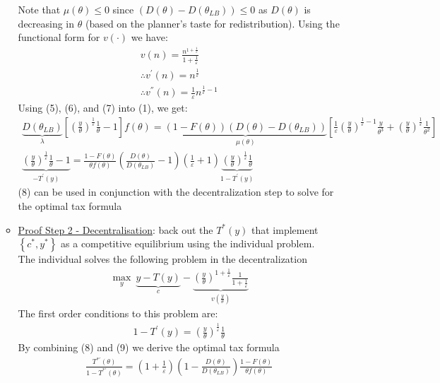 \documentclass{article}
\begin{document}
\begin{itemize}
\begin{itemize}
        Note that $\mu(\theta) \leq 0$ since $(D(\theta) - D(\theta_{LB})) \leq 0$ as $D(\theta)$ is decreasing in $\theta$ (based on the planner's taste for redistribution). Using the functional form for $v(\cdot)$ we have:
        \begin{gather*}
            v(n) = \frac{n^{1+\tfrac{1}{\varepsilon}}}{1 + \tfrac{1}{\varepsilon}} \\
            \therefore v^{'}(n) = n^{\tfrac{1}{\varepsilon}} \tag{7} \\
            \therefore v^{''}(n) = \frac{1}{\varepsilon} n^{\tfrac{1}{\varepsilon} -1} \tag{7}
        \end{gather*}
        Using (5), (6), and (7) into (1), we get:
        \begin{gather*}
            \underbrace{D(\theta_{LB})}_{\lambda} [(\frac{y}{\theta})^{\tfrac{1}{\varepsilon}} \frac{1}{\theta} - 1] f(\theta) = \underbrace{(1 - F(\theta))(D(\theta) - D(\theta_{LB}))}_{\mu(\theta)} [\frac{1}{\varepsilon} (\frac{y}{\theta})^{\tfrac{1}{\varepsilon} - 1} \frac{y}{\theta^{3}} + (\frac{y}{\theta})^{\tfrac{1}{\varepsilon}} \frac{1}{\theta^{2}}] \\
            \underbrace{(\frac{y}{\theta})^{\frac{1}{\varepsilon}} \frac{1}{\theta} - 1}_{-T^{'}(y)} = \frac{1 - F(\theta)}{\theta f (\theta)} (\frac{D(\theta)}{D(\theta_{LB})} - 1) (\frac{1}{\varepsilon} + 1) \underbrace{(\frac{y}{\theta})^{\tfrac{1}{\varepsilon}} \frac{1}{\theta}}_{1 - T^{'}(y)} \tag{8}
        \end{gather*}
        (8) can be used in conjunction with the decentralization step to solve for the optimal tax formula
        \item  \underline{Proof Step 2 - Decentralisation}: back out the $T^{*}(y)$ that implement $\left\{ c^{*}, y^{*} \right\}$ as a competitive equilibrium using the individual problem. \\
        The individual solves the following problem in the decentralization
        \begin{gather*}
            \max_{y} \ \underbrace{y - T(y)}_{c} - \underbrace{(\frac{y}{\theta})^{1 + \frac{1}{\varepsilon}} \frac{1}{1 + \tfrac{1}{\varepsilon}}}_{v(\tfrac{y}{\theta})}
        \end{gather*}
        The first order conditions to this problem are:
        \begin{gather*}
            1 - T^{'}(y) = (\frac{y}{\theta})^{\tfrac{1}{\varepsilon}} \frac{1}{\theta} \tag{9}
        \end{gather*}
        By combining (8) and (9) we derive the optimal tax formula
        \begin{gather*}
            \frac{T^{*'}(\theta)}{1 - T^{*'}(\theta)} = (1 + \frac{1}{\varepsilon}) (1 - \frac{D(\theta)}{D(\theta_{LB})}) \frac{1 - F(\theta)}{\theta f(\theta)}
        \end{gather*}
    \end{itemize}
\end{itemize}
\end{document}

